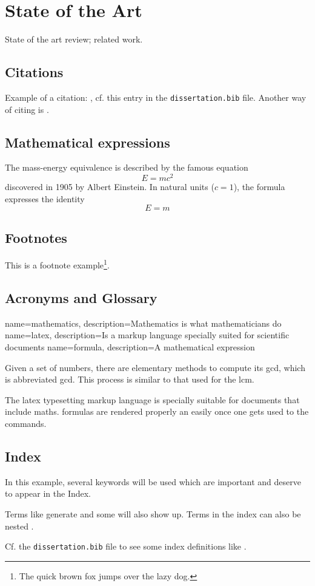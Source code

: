 \chapter{State of the Art}

State of the art review; related work.

\section{Citations}
Example of a citation: \cite{GRM97}, cf. this entry in the \texttt{dissertation.bib} file.
Another way of citing is \citep{KeR88}.

\section{Mathematical expressions}
The mass-energy equivalence is described by the famous equation
\begin{equation}
E=mc^2
\end{equation}
discovered in 1905 by Albert Einstein. 
In natural units ($c = 1$), the formula expresses the identity
\[
E=m
\]

\section{Footnotes}
This is a footnote example\footnote{The quick brown fox jumps over the lazy dog.}.

\section{Acronyms and Glossary}
{
    name=mathematics,
    description={Mathematics is what mathematicians do}
}
{
    name=latex,
    description={Is a markup language specially suited for 
scientific documents}
}
{
    name=formula,
    description={A mathematical expression}
}

Given a set of numbers, there are elementary methods to compute 
its \acrlong{gcd}, which is abbreviated \acrshort{gcd}. This process 
is similar to that used for the \acrfull{lcm}.

The \Gls{latex} typesetting markup language is specially suitable 
for documents that include \gls{maths}. \Glspl{formula} are rendered 
properly an easily once one gets used to the commands.

\section{Index}

In this example, several keywords will be used 
which are important and deserve to appear in the Index.

Terms like generate and some will also 
show up. Terms in the index can also be nested .

Cf. the \texttt{dissertation.bib} file to see some index definitions like .
